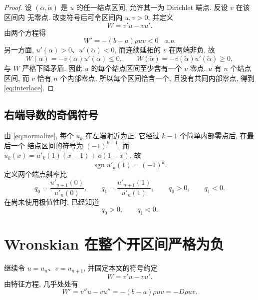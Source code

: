 \documentclass[UTF8]{ctexart}
\begin{document}
\begin{proof}
设 $(\alpha,\tilde\alpha)$ 是 $u$ 的任一结点区间, 允许其一为 Dirichlet 端点. 反设 $v$ 在该区间内
无零点. 改变符号后可令区间内 $u,v>0$, 并定义
\begin{equation*}
	W=v'u-vu' .
\end{equation*}
由两个方程得
\begin{equation}
	W'=-(b-a)\rho uv<0\quad\text{a.e.}
	\label{eq:wprime}
\end{equation}
另一方面, $u'(\alpha)>0$、$u'(\tilde\alpha)<0$, 而连续延拓的 $v$ 在两端非负, 故
\begin{equation*}
	W(\alpha)=-v(\alpha)u'(\alpha)\le0,\qquad
	W(\tilde\alpha)=-v(\tilde\alpha)u'(\tilde\alpha)\ge0,
\end{equation*}
与 $W$ 严格下降矛盾. 因此 $u$ 的每个结点区间至少含有一个 $v$ 零点. $u$ 有 $n$ 个结点区间, 而
$v$ 恰有 $n$ 个内部零点, 所以每个区间恰含一个, 且没有共同内部零点, 得到 \eqref{eq:interlace}.
\end{proof}

\subsection{右端导数的奇偶符号}

由 \eqref{eq:normalize}, 每个 $u_k$ 在左端附近为正. 它经过 $k-1$ 个简单内部零点后, 在最后一个
结点区间的符号为 $(-1)^{k-1}$. 而 $u_k(x)=u'_k(1)(x-1)+o(1-x)$, 故
\begin{equation}
	\operatorname{sgn}u'_k(1)=(-1)^k .
	\label{eq:parity}
\end{equation}
定义两个端点斜率比
\begin{equation}
	q_0=\frac{u'_{n+1}(0)}{u'_n(0)},\qquad q_1=\frac{u'_{n+1}(1)}{u'_n(1)},\qquad
	q_0>0,\qquad q_1<0 .
	\label{eq:q}
\end{equation}
在尚未使用极值性时, 已经知道
\begin{equation*}
	q_0>0,\qquad q_1<0 .
\end{equation*}

\section{Wronskian 在整个开区间严格为负}

继续令 $u=u_n$、$v=u_{n+1}$, 并固定本文的符号约定
\begin{equation}
	W=v'u-vu' .
	\label{eq:wdef}
\end{equation}
由特征方程, 几乎处处有
\begin{equation}
	W'=v''u-vu''=-(b-a)\rho uv=-D\rho uv .
	\label{eq:wprime2}
\end{equation}
\end{document}
